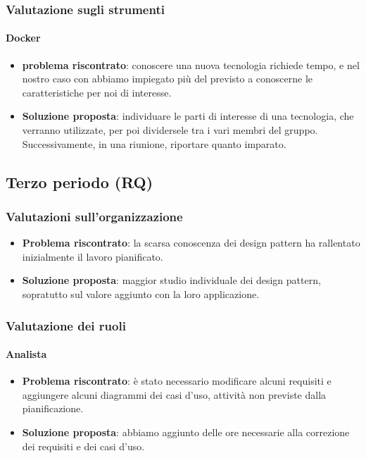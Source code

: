     \subsubsection{Valutazione sugli strumenti}

        \paragraph{Docker}
            \begin{itemize}
                \item \textbf{problema riscontrato}: conoscere una nuova tecnologia richiede tempo, e nel nostro caso con  abbiamo impiegato più del previsto a conoscerne le caratteristiche per noi di interesse.
                \item \textbf{Soluzione proposta}: individuare le parti di interesse di una tecnologia, che verranno utilizzate, per poi dividersele tra i vari membri del gruppo. Successivamente, in una riunione, riportare quanto imparato.
            \end{itemize}


    \subsection{Terzo periodo (RQ)}\label{valutazioni per il miglioramento:RQ}

    \subsubsection{Valutazioni sull'organizzazione}
        \begin{itemize}
            \item \textbf{Problema riscontrato}: la scarsa conoscenza dei design pattern ha rallentato inizialmente il lavoro pianificato.
            \item \textbf{Soluzione proposta}: maggior studio individuale dei design pattern, sopratutto sul valore aggiunto con la loro applicazione.
        \end{itemize}

    \subsubsection{Valutazione dei ruoli}

        \paragraph{Analista}
            \begin{itemize}
                \item \textbf{Problema riscontrato}: è stato necessario modificare alcuni requisiti e aggiungere alcuni diagrammi dei casi d'uso, attività non previste dalla pianificazione.
                \item \textbf{Soluzione proposta}: abbiamo aggiunto delle ore necessarie alla correzione dei requisiti e dei casi d'uso.
            \end{itemize}

